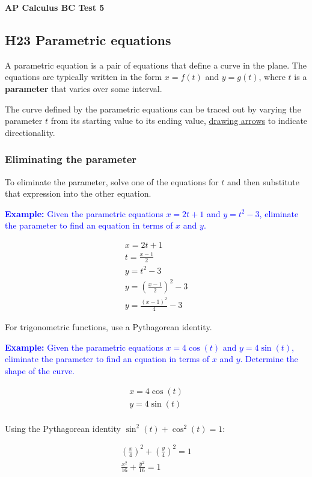 \documentclass[letterpaper, 12pt]{article}
\newcommand{\example}[1]{\textcolor{blue}{\textbf{Example:} #1}}
\begin{document}
\begin{center}
\textbf{{\Large AP Calculus BC Test 5}}
\end{center}

\subsection*{H23 Parametric equations}

A parametric equation is a pair of equations that define a curve in the plane. The equations are typically written in the form $x = f(t)$ and $y = g(t)$, where $t$ is a \textbf{parameter} that varies over some interval.

The curve defined by the parametric equations can be traced out by varying the parameter $t$ from its starting value to its ending value, \underline{drawing arrows} to indicate directionality.

\subsubsection*{Eliminating the parameter}
To eliminate the parameter, solve one of the equations for $t$ and then substitute that expression into the other equation.

\example{Given the parametric equations $x = 2t + 1$ and $y = t^2 - 3$, eliminate the parameter to find an equation in terms of $x$ and $y$.}

\begin{gather*}
x = 2t + 1 \\
t = \frac{x - 1}{2} \\
y = t^2 - 3 \\
y = \left(\frac{x - 1}{2}\right)^2 - 3 \\
\boxed{y = \frac{(x - 1)^2}{4} - 3}
\end{gather*}

For trigonometric functions, use a Pythagorean identity.

\example{Given the parametric equations $x = 4\cos(t)$ and $y = 4\sin(t)$, eliminate the parameter to find an equation in terms of $x$ and $y$. Determine the shape of the curve.}

\begin{gather*}
x = 4\cos(t) \\
y = 4\sin(t) \\
\end{gather*}

Using the Pythagorean identity $\sin^2(t) + \cos^2(t) = 1$:

\begin{gather*}
\left(\frac{x}{4}\right)^2 + \left(\frac{y}{4}\right)^2 = 1 \\
\boxed{\frac{x^2}{16} + \frac{y^2}{16} = 1}
\end{gather*}
\end{document}
